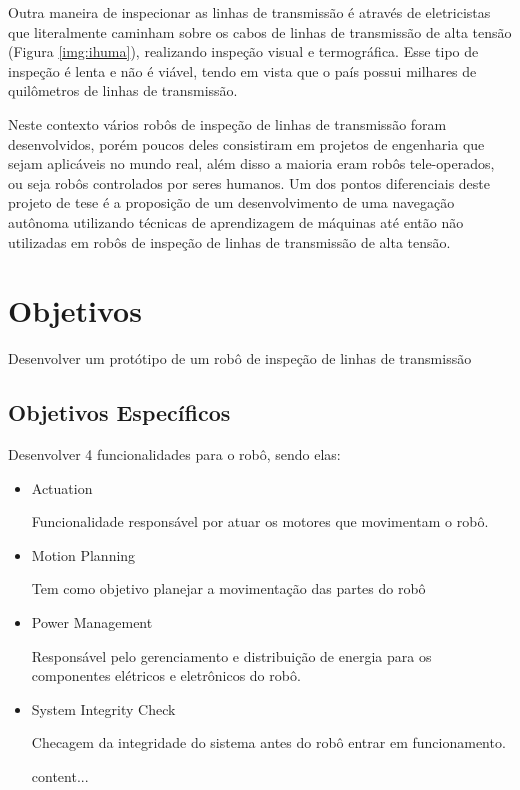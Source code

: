 Outra maneira de inspecionar as linhas de transmissão é através de eletricistas que literalmente caminham sobre os cabos de linhas de transmissão de alta tensão (Figura \ref{img:ihuma}), realizando inspeção visual e termográfica. Esse tipo de inspeção é lenta e não é viável, tendo em vista que o país possui milhares de quilômetros de linhas de transmissão.

Neste contexto vários robôs de inspeção de linhas de transmissão foram desenvolvidos, porém poucos deles consistiram em projetos de engenharia que sejam aplicáveis no mundo real, além disso a maioria eram robôs tele-operados, ou seja robôs controlados por seres humanos. Um dos pontos diferenciais deste projeto de tese é a proposição de um desenvolvimento de uma navegação autônoma utilizando técnicas de aprendizagem de máquinas até então não utilizadas em robôs de inspeção de linhas de transmissão de alta tensão.

\section{Objetivos}
\label{sec:obj}

Desenvolver um protótipo de um robô de inspeção de linhas de transmissão

\subsection{Objetivos Específicos}
\label{ssec:objesp}
Desenvolver 4 funcionalidades para o robô, sendo elas:
\begin{itemize}
	\item Actuation
	
	Funcionalidade responsável por atuar os motores que movimentam o robô.
	
	
	\item Motion Planning
	
	Tem como objetivo planejar a movimentação das partes do robô
	

	\item Power Management
	
	Responsável pelo gerenciamento e distribuição de energia para os componentes elétricos e eletrônicos do robô.
		
	
	\item System Integrity Check
	
	Checagem da integridade do sistema antes do robô entrar em funcionamento.
	
	
	
	content...
\end{itemize}

